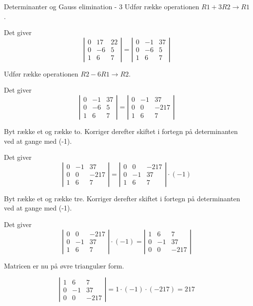 \documentclass{article}
\begin{document}
\begin{exercise}{Determinanter og Gauss elimination - 3}
\hint
Udfør række operationen
$R1 + 3R2 \to R1$.

\hint
Det giver 
\[
\left|\begin{array}{rrr}
0 & 17 & 22 \\ 
0 & -6 & 5 \\
1 & 6 & 7
\end{array} \right|
=
\left|\begin{array}{rrr}
0 & -1 & 37 \\ 
0 & -6 & 5 \\
1 & 6 & 7
\end{array} \right|
\]

\hint
Udfør række operationen
$R2 - 6R1 \to R2$.

\hint
Det giver 
\[
\left|\begin{array}{rrr}
0 & -1 & 37 \\ 
0 & -6 & 5 \\
1 & 6 & 7
\end{array} \right|
=
\left|\begin{array}{rrr}
0 & -1 & 37 \\ 
0 & 0 & -217 \\
1 & 6 & 7
\end{array} \right|
\]

\hint
Byt række et og række to.
Korriger derefter skiftet i fortegn på determinanten ved at
gange med (-1).

\hint
Det giver 
\[
\left|\begin{array}{rrr}
0 & -1 & 37 \\ 
0 & 0 & -217 \\
1 & 6 & 7
\end{array} \right|
=
\left|\begin{array}{rrr}
0 & 0 & -217 \\
0 & -1 & 37 \\ 
1 & 6 & 7
\end{array} \right| \cdot (-1)
\]

\hint
Byt række et og række tre.
Korriger derefter skiftet i fortegn på determinanten ved at
gange med (-1).

\hint
Det giver 
\[
\left|\begin{array}{rrr}
0 & 0 & -217 \\
0 & -1 & 37 \\ 
1 & 6 & 7
\end{array} \right| \cdot (-1)
=
\left|\begin{array}{rrr}
1 & 6 & 7 \\
0 & -1 & 37 \\ 
0 & 0 & -217
\end{array} \right|
\]

\hint
Matricen er nu på øvre triangulær form.

\hint
\[
\left|\begin{array}{rrr}
1 & 6 & 7 \\
0 & -1 & 37 \\ 
0 & 0 & -217
\end{array} \right|
= 1 \cdot (-1) \cdot (-217) = 217
\]


\end{exercise}
\end{document}
